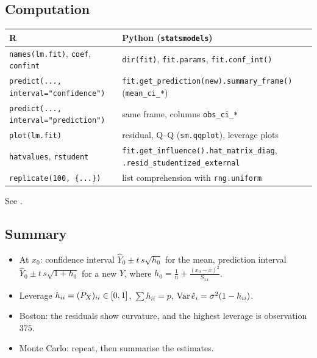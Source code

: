 \subsection{Computation}
\begin{center}\small
\begin{tabular}{@{}>{\raggedright\arraybackslash}p{7cm}>{\raggedright\arraybackslash}p{8.4cm}@{}}\hline
R & Python (\texttt{statsmodels})\\\hline
\texttt{names(lm.fit)}, \texttt{coef}, \texttt{confint} & \texttt{dir(fit)}, \texttt{fit.params}, \texttt{fit.conf\_int()}\\
\texttt{predict(..., interval="confidence")} & \texttt{fit.get\_prediction(new).summary\_frame()} (\texttt{mean\_ci\_*})\\
\texttt{predict(..., interval="prediction")} & same frame, columns \texttt{obs\_ci\_*}\\
\texttt{plot(lm.fit)} & residual, Q--Q (\texttt{sm.qqplot}), leverage plots\\
\texttt{hatvalues}, \texttt{rstudent} & \texttt{fit.get\_influence().hat\_matrix\_diag}, \texttt{.resid\_studentized\_external}\\
\texttt{replicate(100, \{...\})} & list comprehension with \texttt{rng.uniform}\\\hline
\end{tabular}
\end{center}
See .

\subsection{Summary}
\begin{itemize}
  \item At $x_0$: confidence interval $\hat Y_0\pm t\,s\sqrt{h_0}$ for the mean, prediction interval $\hat Y_0\pm t\,s\sqrt{1+h_0}$ for a new $Y$, where $h_0=\frac1n+\frac{(x_0-\bar x)^2}{S_{xx}}$.
  \item Leverage $h_{ii}=(P_X)_{ii}\in[0,1]$, $\sum h_{ii}=p$, $\operatorname{Var}\hat e_i=\sigma^2(1-h_{ii})$.
  \item Boston: the residuals show curvature, and the highest leverage is observation $375$.
  \item Monte Carlo: repeat, then summarise the estimates.
\end{itemize}

